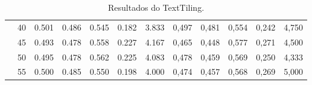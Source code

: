 \begin{table}[!h]
\begin{tabular}{|c|c||c|c|c|c|c||c|c|c|c|c|}
  & 40 & 0.501 & 0.486 & 0.545 & 0.182  & 3.833                & 0,497 & 0,481 & 0,554 & 0,242 & 4,750  \\ \cline{2-12} 
  & 45 & 0.493 & 0.478 & 0.558 & 0.227  & 4.167                & 0,465 & 0,448 & 0,577 & 0,271 & 4,500  \\ \cline{2-12} 
  & 50 & 0.495 & 0.478 & 0.562 & 0.225  & 4.083                & 0,478 & 0,459 & 0,569 & 0,250 & 4,333  \\ \cline{2-12} 
  & 55 & 0.500 & 0.485 & 0.550 & 0.198  & 4.000                & 0,474 & 0,457 & 0,568 & 0,269 & 5,000  \\ \hline      

 \end{tabular}  
\caption{Resultados do TextTiling.}
\label{tab:resultados-tt-pp}
\end{table} 


























